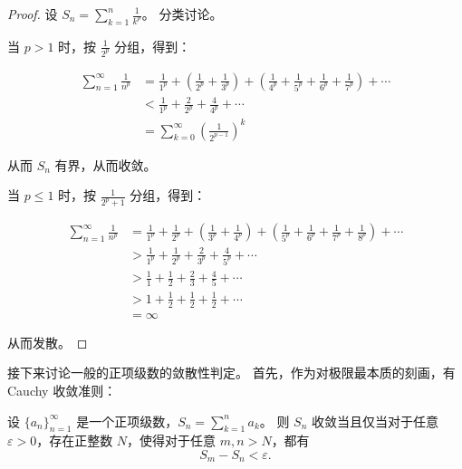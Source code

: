 \begin{proof}
  设 $S_n = \sum_{k=1}^{n} \frac{1}{k^p}$。
  分类讨论。

  当 $p > 1$ 时，按 $\frac{1}{2^p}$ 分组，得到：

  \begin{equation*}
    \begin{aligned}
      \sum_{n=1}^{\infty} \frac{1}{n^p}
      &= \frac{1}{1^p}
      + \left(\frac{1}{2^p} + \frac{1}{3^p}\right)
      + \left(\frac{1}{4^p} + \frac{1}{5^p} + \frac{1}{6^p} + \frac{1}{7^p}\right)
      + \cdots \\
      &< \frac{1}{1^p} + \frac{2}{2^p} + \frac{4}{4^p} + \cdots \\
      &= \sum_{k=0}^{\infty} \left(\frac{1}{2^{p-1}}\right)^k
    \end{aligned}
  \end{equation*}

  从而 $S_n$ 有界，从而收敛。

  当 $p \leq 1$ 时，按 $\frac{1}{2^p+1}$ 分组，得到：

  \begin{equation*}
    \begin{aligned}
      \sum_{n=1}^{\infty} \frac{1}{n^p}
      &= \frac{1}{1^p} + \frac{1}{2^p}
      + \left(\frac{1}{3^p} + \frac{1}{4^p}\right)
      + \left(\frac{1}{5^p} + \frac{1}{6^p} + \frac{1}{7^p} + \frac{1}{8^p}\right)
      + \cdots \\
      &> \frac{1}{1^p} + \frac{1}{2^p} + \frac{2}{3^p} + \frac{4}{5^p} + \cdots \\
      &> \frac{1}{1} + \frac{1}{2} + \frac{2}{3} + \frac{4}{5} + \cdots \\
      &> 1 + \frac{1}{2} + \frac{1}{2} + \frac{1}{2} + \cdots \\
      &= \infty
    \end{aligned}
  \end{equation*}

  从而发散。

\end{proof}

接下来讨论一般的正项级数的敛散性判定。
首先，作为对极限最本质的刻画，有 Cauchy 收敛准则：

\begin{theorem}\label{thm:cauchy-convergence}
  设 $\{a_n\}_{n=1}^{\infty}$ 是一个正项级数，$S_n = \sum_{k=1}^{n} a_k$。
  则 $S_n$ 收敛当且仅当对于任意 $\varepsilon > 0$，存在正整数 $N$，使得对于任意 $m, n > N$，都有
  \begin{equation*}
    S_m - S_n < \varepsilon.
  \end{equation*}
\end{theorem}

